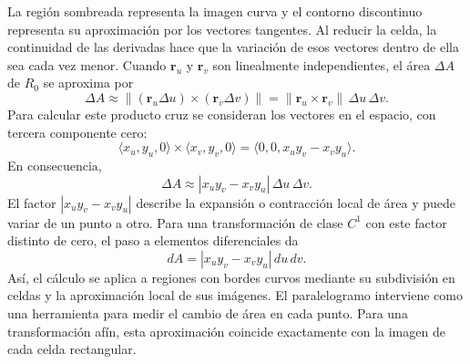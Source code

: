 \begingroup
\shorthandoff{>}
\begin{center}
\end{center}
\endgroup

La región sombreada representa la imagen curva y el contorno discontinuo representa su aproximación por los vectores tangentes. Al reducir la celda, la continuidad de las derivadas hace que la variación de esos vectores dentro de ella sea cada vez menor. Cuando $\mathbf{r}_u$ y $\mathbf{r}_v$ son linealmente independientes, el área $\Delta A$ de $R_0$ se aproxima por
\[
\Delta A\approx
\| (\mathbf{r}_u\Delta u)\times(\mathbf{r}_v\Delta v)\|
=\|\mathbf{r}_u\times\mathbf{r}_v\|\,\Delta u\,\Delta v.
\]
Para calcular este producto cruz se consideran los vectores en el espacio, con tercera componente cero:
\[
\langle x_u,y_u,0\rangle\times\langle x_v,y_v,0\rangle
=\langle0,0,x_u y_v-x_v y_u\rangle.
\]
En consecuencia,
\[
\Delta A\approx |x_u y_v-x_v y_u|\,\Delta u\,\Delta v.
\]
El factor $|x_u y_v-x_v y_u|$ describe la expansión o contracción local de área y puede variar de un punto a otro. Para una transformación de clase $C^1$ con este factor distinto de cero, el paso a elementos diferenciales da
\[
dA=|x_u y_v-x_v y_u|\,du\,dv.
\]
Así, el cálculo se aplica a regiones con bordes curvos mediante su subdivisión en celdas y la aproximación local de sus imágenes. El paralelogramo interviene como una herramienta para medir el cambio de área en cada punto. Para una transformación afín, esta aproximación coincide exactamente con la imagen de cada celda rectangular.

